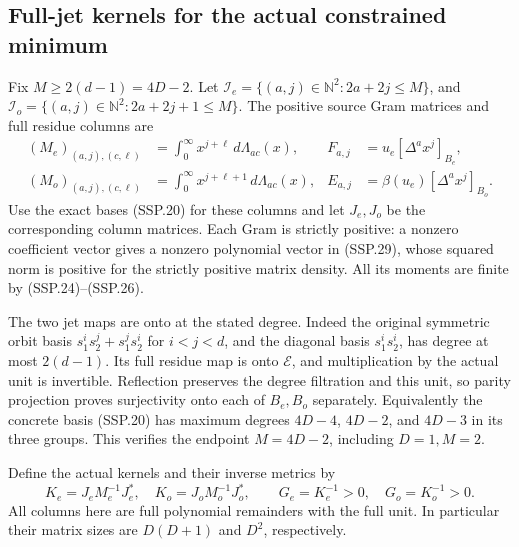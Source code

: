 \subsection{Full-jet kernels for the actual constrained minimum}

Fix \(M\ge2(d-1)=4D-2\).
Let \(\mathcal I_e=\{(a,j)\in\mathbb N^2:2a+2j\le M\}\),
and \(\mathcal I_o=\{(a,j)\in\mathbb N^2:2a+2j+1\le M\}\).
The positive source Gram matrices and full residue columns are
\[
 \begin{aligned}
 (M_e)_{(a,j),(c,\ell)}
     &=\int_0^\infty x^{j+\ell}\,d\Lambda_{ac}(x),
 &F_{a,j}&=u_e[\Delta^ax^j]_{B_e},\\
 (M_o)_{(a,j),(c,\ell)}
     &=\int_0^\infty x^{j+\ell+1}\,d\Lambda_{ac}(x),
 &E_{a,j}&=\beta(u_e)[\Delta^ax^j]_{B_o}.
 \end{aligned}                                                    \tag{SSP.31}
\]
Use the exact bases (SSP.20) for these columns and let \(J_e,J_o\)
be the corresponding column matrices.  Each Gram is strictly
positive: a nonzero coefficient vector gives a nonzero polynomial
vector in (SSP.29), whose squared norm is positive for the
strictly positive matrix density.  All its moments are finite by
(SSP.24)--(SSP.26).

The two jet maps are onto at the stated degree.  Indeed the
original symmetric orbit basis \(s_1^is_2^j+s_1^js_2^i\)
for \(i<j<d\), and the diagonal basis \(s_1^is_2^i\), has
degree at most \(2(d-1)\).  Its full residue map is onto
\(\mathcal E\), and multiplication by the actual unit is
invertible.  Reflection preserves the degree filtration and
this unit, so parity projection proves surjectivity onto
each of \(B_e,B_o\) separately.  Equivalently the concrete
basis (SSP.20) has maximum degrees \(4D-4\), \(4D-2\),
and \(4D-3\) in its three groups.  This verifies the
endpoint \(M=4D-2\), including \(D=1,M=2\).

Define the actual kernels and their inverse metrics by
\[
 K_e=J_eM_e^{-1}J_e^*,\quad K_o=J_oM_o^{-1}J_o^*,\qquad
 G_e=K_e^{-1}>0,\quad G_o=K_o^{-1}>0.
 \tag{SSP.32}
\]
All columns here are full polynomial remainders with the full
unit.  In particular their matrix sizes are
\(D(D+1)\) and \(D^2\), respectively.

